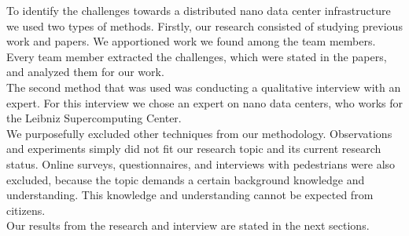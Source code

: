 
To identify the challenges towards a distributed nano data center infrastructure we used two types of methods. Firstly, our research consisted of studying previous work and papers. We apportioned work we found among the team members. Every team member extracted the challenges, which were stated in the papers, and analyzed them for our work. \\
The second method that was used was conducting a qualitative interview with an expert. For this interview we chose an expert on nano data centers, who works for the Leibniz Supercomputing Center. \\
We purposefully excluded other techniques from our methodology. Observations and experiments simply did not fit our research topic and its current research status. Online surveys, questionnaires, and interviews with pedestrians were also excluded, because the topic demands a certain background knowledge and understanding. This knowledge and understanding cannot be expected from citizens. \\
Our results from the research and interview are stated in the next sections. 
